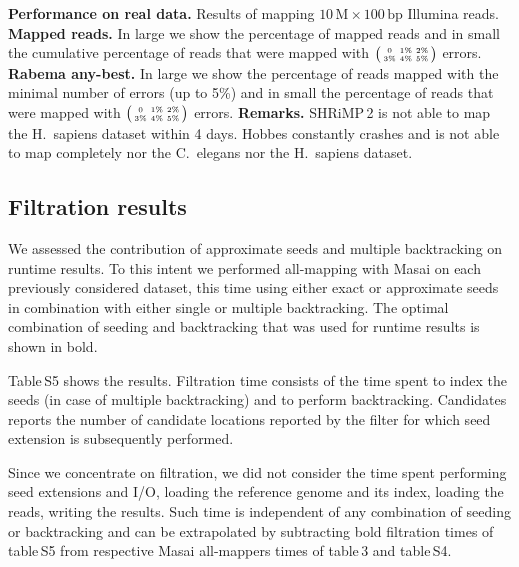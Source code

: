\begin{table*}[t]
  \caption[Performance on real data]{
    \label{tab:Runtime}
    \textbf{Performance on real data.}
	Results of mapping $10\,\text{M}\times 100\,\text{bp}$ Illumina reads.
	\textbf{Mapped reads.}
	In large we show the percentage of mapped reads and in small the cumulative percentage of reads that were mapped with $\bigl(\begin{smallmatrix}\mbox{\tiny 0}&\mbox{\tiny 1\%}&\mbox{\tiny 2\%}\\\mbox{\tiny 3\%}&\mbox{\tiny 4\%}&\mbox{\tiny 5\%}\end{smallmatrix}\bigr)$ errors.
	\textbf{Rabema any-best.}
    In large we show the percentage of reads mapped with the minimal number of errors (up to 5\%) and in small the percentage of reads that were mapped with $\bigl(\begin{smallmatrix}\mbox{\tiny 0}&\mbox{\tiny 1\%}&\mbox{\tiny 2\%}\\\mbox{\tiny 3\%}&\mbox{\tiny 4\%}&\mbox{\tiny 5\%}\end{smallmatrix}\bigr)$ errors.
	\textbf{Remarks.}
    SHRiMP\,2 is not able to map the H.~sapiens dataset within 4 days.
    Hobbes constantly crashes and is not able to map completely nor the C.~elegans nor the H.~sapiens dataset.
  }
	\vspace{-3mm}
	\center
	\sffamily
	\resizebox{1.0\textwidth}{!}
	{
		\renewcommand{\tabcolsep}{0.8ex}
		
	}
\end{table*}


\subsection{Filtration results}

We assessed the contribution of approximate seeds and multiple backtracking on runtime results.
To this intent we performed all-mapping with Masai on each previously considered dataset, this time using either exact or approximate seeds in combination with either single or multiple backtracking.
The optimal combination of seeding and backtracking that was used for runtime results is shown in bold.

Table\,S5 shows the results.
Filtration time consists of the time spent to index the seeds (in case of multiple backtracking) and to perform backtracking.
Candidates reports the number of candidate locations reported by the filter for which seed extension is subsequently performed.

Since we concentrate on filtration, we did not consider the time spent performing seed extensions and I/O, \ie loading the reference genome and its index, loading the reads, writing the results.
Such time is independent of any combination of seeding or backtracking and can be extrapolated by subtracting bold filtration times of table\,S5 from respective Masai all-mappers times of table\,3 and table\,S4.


